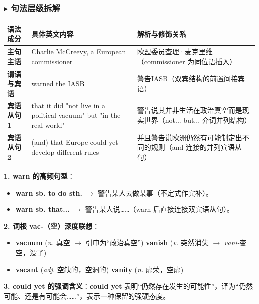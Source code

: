 \documentclass[cn,normal,11pt]{elegantnote}
\begin{document}
\subsubsection*{$\blacktriangleright$ 句法层级拆解}
\noindent
\begin{tabularx}{\textwidth}{p{3.2cm} X X}
  \toprule
  \textbf{语法成分} & \textbf{具体英文内容} & \textbf{解析与修饰关系} \\
  \midrule
  \textbf{主句主语} & Charlie McCreevy, a European commissioner & 欧盟委员查理·麦克里维（commissioner 为同位语插入） \\
  \midrule
  \textbf{谓语与宾语} & warned the IASB & 警告IASB（双宾结构的前置间接宾语） \\
  \midrule
  \textbf{宾语从句 1} & that it did "not live in a political vacuum" but "in the real world" & 警告说其并非生活在政治真空而是现实世界（not... but... 介词并列结构） \\
  \midrule
  \textbf{宾语从句 2} & (and) that Europe could yet develop different rules & 并且警告说欧洲仍然有可能制定出不同的规则（and 连接的并列宾语从句） \\
  \bottomrule
\end{tabularx}

\begin{proposition}
  \textbf{1. warn 的高频句型}：
  \begin{itemize}
    \item \textbf{warn sb. to do sth.} $\rightarrow$ 警告某人去做某事（不定式作宾补）。
    \item \textbf{warn sb. that...} $\rightarrow$ 警告某人说……（warn 后直接连接双宾语从句）。
  \end{itemize}
  \textbf{2. 词根 vac-（空）深度联想}：
  \begin{itemize}
    \item \textbf{vacuum} (\textit{n.} 真空 $\rightarrow$ 引申为“政治真空”) \quad \textbf{vanish} (\textit{v.} 突然消失 $\rightarrow$ \textit{vani-}变空，没了)
    \item \textbf{vacant} (\textit{adj.} 空缺的，空洞的) \quad \textbf{vanity} (\textit{n.} 虚荣，空虚)
  \end{itemize}
  \textbf{3. could yet 的强调含义}：\textbf{could yet} 表明“仍然存在发生的可能性”，译为“仍然可能、还是有可能会……”，表示一种保留的强硬态度。
\end{proposition}
\end{document}
